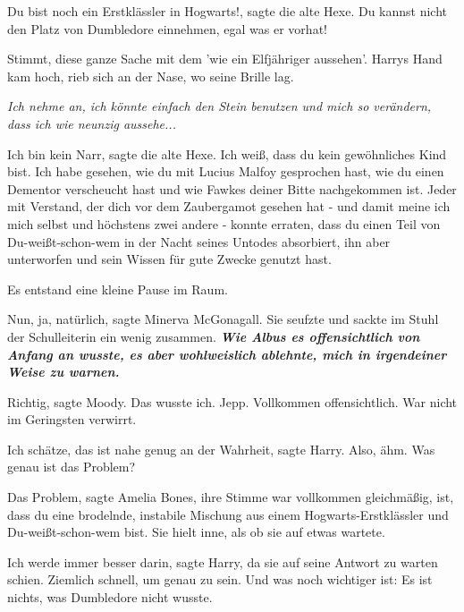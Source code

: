 \glqq{}Du bist noch ein Erstklässler in Hogwarts!\grqq{}, sagte die alte Hexe.
\glqq{}Du kannst nicht den Platz von Dumbledore einnehmen, egal was er vorhat!\grqq{}

\glqq{}Stimmt, diese ganze Sache mit dem 'wie ein Elfjähriger aussehen'.\grqq{} Harrys
Hand kam hoch, rieb sich an der Nase, wo seine Brille lag.

\emph{Ich nehme an, ich könnte einfach den Stein benutzen und mich so verändern,
dass ich wie neunzig aussehe...}

\glqq{}Ich bin kein Narr\grqq{}, sagte die alte Hexe. \glqq{}Ich weiß, dass du
kein gewöhnliches Kind bist. Ich habe gesehen, wie du mit Lucius Malfoy
gesprochen hast, wie du einen Dementor verscheucht hast und wie Fawkes deiner
Bitte nachgekommen ist. Jeder mit Verstand, der dich vor dem Zaubergamot gesehen
hat - und damit meine ich mich selbst und höchstens zwei andere - konnte
erraten, dass du einen Teil von Du-weißt-schon-wem in der Nacht seines Untodes
absorbiert, ihn aber unterworfen und sein Wissen für gute Zwecke genutzt hast.\grqq{}

Es entstand eine kleine Pause im Raum.

\glqq{}Nun, ja, natürlich\grqq{}, sagte Minerva McGonagall. Sie seufzte und
sackte im Stuhl der Schulleiterin ein wenig zusammen. \glqq{}\textbf{\emph{Wie
Albus es offensichtlich von Anfang an wusste, es aber wohlweislich ablehnte,
mich in irgendeiner Weise zu warnen.}}\grqq{}

\glqq{}Richtig\grqq{}, sagte Moody. \glqq{}Das wusste ich. Jepp. Vollkommen
offensichtlich. War nicht im Geringsten verwirrt.\grqq{}

\glqq{}Ich schätze, das ist nahe genug an der Wahrheit\grqq{}, sagte Harry. \glqq{}
Also, ähm. Was genau ist das Problem?\grqq{}

\glqq{}Das Problem\grqq{}, sagte Amelia Bones, ihre Stimme war vollkommen
gleichmäßig, \glqq{}ist, dass du eine brodelnde, instabile Mischung aus einem
Hogwarts-Erstklässler und Du-weißt-schon-wem bist.\grqq{} Sie hielt inne, als ob sie
auf etwas wartete.

\glqq{}Ich werde immer besser darin\grqq{}, sagte Harry, da sie auf seine Antwort
zu warten schien. \glqq{}Ziemlich schnell, um genau zu sein. Und was noch
wichtiger ist: Es ist nichts, was Dumbledore nicht wusste.\grqq{}

